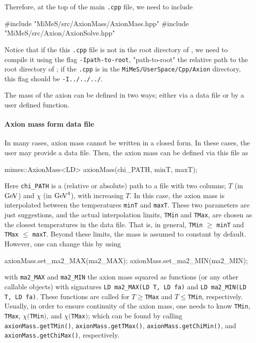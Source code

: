 \documentclass[11pt,a4paper]{article}
\begin{document}
Therefore, at the top of the main {\tt .cpp} file, we need to include 
%
\begin{cpp}
	#include "MiMeS/src/AxionMass/AxionMass.hpp"
	#include "MiMeS/src/Axion/AxionSolve.hpp"
\end{cpp}
%
Notice that if the this {\tt .cpp} file is not in the root directory of \mimes, we need to compile it using the flag {\tt -Ipath-to-root}, "path-to-root" the relative path to the root directory of \mimes; \eg if the {\tt .cpp} is in the {\tt MiMeS/UserSpace/Cpp/Axion} directory, this flag should be {\tt -I../../../}.

The mass of the axion can be defined in two ways; either via a data file or by a user defined function. 

\paragraph{Axion mass form data file} 
In many cases, axion mass cannot be written in a closed form. In these cases, the user may provide a data file. Then, the axion mass can be defined via this file as
%
\begin{cpp}
	mimes::AxionMass<LD> axionMass(chi_PATH, minT, maxT);
\end{cpp}
%
Here {\tt chi\_PATH} is a (relative or absolute) path to a file with two columns; $T$ (in ${\rm GeV}$) and $\chi$ (in ${\rm GeV}^4$), with increasing $T$. In this case, the axion mass is interpolated between the temperatures {\tt minT} and {\tt maxT}. These two parameters are just suggestions, and the actual interpolation limits, {\tt  TMin} and {\tt TMax}, are chosen as the closest temperatures in the data file. That is, in general, {\tt TMin} $\geq$ {\tt minT} and {\tt TMax} $\leq$ {\tt maxT}. Beyond these limits, the mass is assumed to constant by default. However, one can change this by using 
%
\begin{cpp}
	axionMass.set_ma2_MAX(ma2_MAX);
	axionMass.set_ma2_MIN(ma2_MIN);
\end{cpp}
%
with {\tt ma2\_MAX} and {\tt ma2\_MIN} the axion mass squared as functions (or any other callable objects) with signatures {\tt LD ma2\_MAX(LD T, LD fa)} and {\tt LD ma2\_MIN(LD T, LD fa)}. These functions are called for $T\geq${\tt TMax} and $T\leq${\tt TMin}, respectively. Usually, in order to ensure continuity of the axion mass, one needs to know {\tt TMin}, {\tt TMax}, $\chi(${\tt TMin}$)$, and $\chi(${\tt TMax}$)$; which can be found by calling {\tt axionMass.getTMin()}, {\tt axionMass.getTMax()}, {\tt axionMass.getChiMin()}, and {\tt axionMass.getChiMax()}, respectively.
\end{document}
